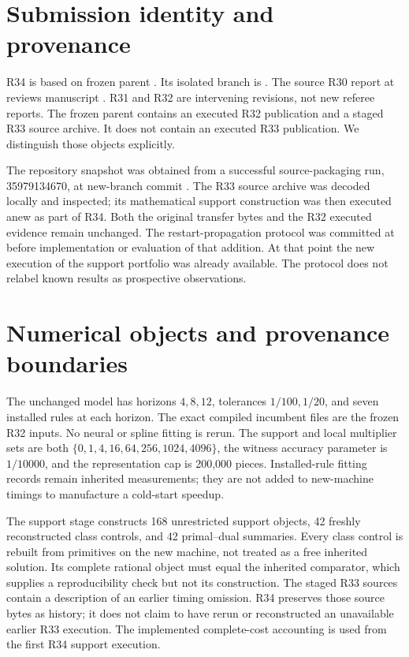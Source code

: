 \section{Submission identity and provenance}
R34 is based on frozen parent . Its isolated branch is . The source R30 report at  reviews manuscript . R31 and R32 are intervening revisions, not new referee reports. The frozen parent contains an executed R32 publication and a staged R33 source archive. It does not contain an executed R33 publication. We distinguish those objects explicitly.

The repository snapshot was obtained from a successful source-packaging run, 35979134670, at new-branch commit . The R33 source archive was decoded locally and inspected; its mathematical support construction was then executed anew as part of R34. Both the original transfer bytes and the R32 executed evidence remain unchanged. The restart-propagation protocol was committed at  before implementation or evaluation of that addition. At that point the new execution of the support portfolio was already available. The protocol does not relabel known results as prospective observations.

\section{Numerical objects and provenance boundaries}
The unchanged model has horizons $4,8,12$, tolerances $1/100,1/20$, and seven installed rules at each horizon. The exact compiled incumbent files are the frozen R32 inputs. No neural or spline fitting is rerun. The support and local multiplier sets are both $\{0,1,4,16,64,256,1024,4096\}$, the witness accuracy parameter is $1/10000$, and the representation cap is 200,000 pieces. Installed-rule fitting records remain inherited measurements; they are not added to new-machine timings to manufacture a cold-start speedup.

The support stage constructs 168 unrestricted support objects, 42 freshly reconstructed class controls, and 42 primal--dual summaries. Every class control is rebuilt from primitives on the new machine, not treated as a free inherited solution. Its complete rational object must equal the inherited comparator, which supplies a reproducibility check but not its construction. The staged R33 sources contain a description of an earlier timing omission. R34 preserves those source bytes as history; it does not claim to have rerun or reconstructed an unavailable earlier R33 execution. The implemented complete-cost accounting is used from the first R34 support execution.

